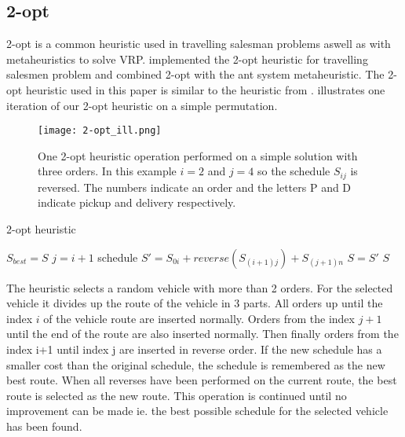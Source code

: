 \documentclass[../main.tex]{subfiles}
\begin{document}
\subsection{2-opt}
\label{sec:2opt}
2-opt is a common heuristic used in travelling salesman problems aswell as with metaheuristics to solve VRP. \cite{lin65} implemented the 2-opt heuristic for travelling salesmen problem and \cite{bullnheimer99} combined 2-opt with the ant system metaheuristic.
The 2-opt heuristic used in this paper is similar to the heuristic from \cite{carrabs07}.
 illustrates one iteration of our 2-opt heuristic on a simple permutation.

\begin{figure}                                                                                     
 \centering                                                                                     
 \texttt{[image: 2-opt\_ill.png]}                                     
 \label{fig:2opt}                                                                            
    \caption{One 2-opt heuristic operation performed on a simple solution with three orders. In this example $i=2$ and $j=4$ so the schedule $S_{ij}$ is reversed. The numbers indicate an order and the letters P and D indicate pickup and delivery respectively.}
\end{figure}

\begin{algorithm}
    \label{alg:2opt}
    \caption{2-opt heuristic}
    \begin{algorithmic}[1]
        \Repeat
        \State $S_{best} = S$
            \State $j=i+1$
                \State schedule $ S' = S_{0i} + reverse(S_{(i+1)j}) + S_{(j+1)n}$ 
                \State $S = S'$
                \EndIf
            \EndFor
        \EndFor
        \State 
        \Return $S$
        \EndFunction
    \end{algorithmic}
\end{algorithm}


The heuristic selects a random vehicle with more than 2 orders.
For the selected vehicle it divides up the route of the vehicle in 3 parts. 
All orders up until the index $i$ of the vehicle route are inserted normally. 
Orders from the index $j+1$ until the end of the route are also inserted normally. 
Then finally orders from the index i+1 until index j are inserted in reverse order.
If the new schedule has a smaller cost than the original schedule, the schedule is remembered as the new best route. 
When all reverses have been performed on the current route, the best route is selected as the new route.
This operation is continued until no improvement can be made ie. the best possible schedule for the selected vehicle has been found.
\end{document}
